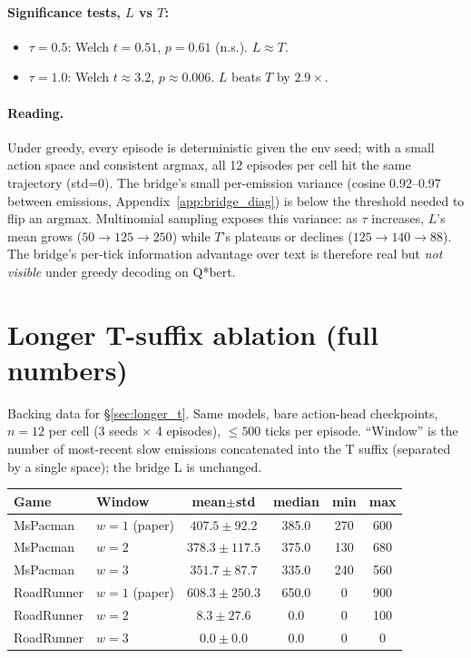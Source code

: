 \documentclass[11pt]{article}
\begin{document}
\paragraph{Significance tests, $L$ vs $T$:}
\begin{itemize}[topsep=0pt,itemsep=0pt,leftmargin=*]
\item $\tau\!=\!0.5$: Welch $t=0.51$, $p=0.61$ (n.s.). $L\!\approx\!T$.
\item $\tau\!=\!1.0$: Welch $t\!\approx\!3.2$, $p\!\approx\!0.006$. $L$ beats $T$ by $2.9\times$.
\end{itemize}

\paragraph{Reading.} Under greedy, every episode is deterministic given the env seed; with a small action space and consistent argmax, all 12 episodes per cell hit the same trajectory (std=0). The bridge's small per-emission variance (cosine 0.92--0.97 between emissions, Appendix~\ref{app:bridge_diag}) is below the threshold needed to flip an argmax. Multinomial sampling exposes this variance: as $\tau$ increases, $L$'s mean grows ($50\!\to\!125\!\to\!250$) while $T$'s plateaus or declines ($125\!\to\!140\!\to\!88$). The bridge's per-tick information advantage over text is therefore real but \emph{not visible} under greedy decoding on Q*bert.

\section{Longer T-suffix ablation (full numbers)}
\label{app:longer_t}

Backing data for \S\ref{sec:longer_t}. Same models, bare action-head checkpoints, $n\!=\!12$ per cell (3 seeds $\times$ 4 episodes), $\le\!500$ ticks per episode. ``Window'' is the number of most-recent slow emissions concatenated into the T suffix (separated by a single space); the bridge L is unchanged.

\smallskip\noindent
\begin{tabular}{llcccc}
\toprule
Game        & Window & mean$\pm$std & median & min & max \\
\midrule
MsPacman    & $w=1$ (paper) & $407.5\pm92.2$  & 385.0 & 270 & 600  \\
MsPacman    & $w=2$         & $378.3\pm117.5$ & 375.0 & 130 & 680  \\
MsPacman    & $w=3$         & $351.7\pm87.7$  & 335.0 & 240 & 560  \\
\midrule
RoadRunner  & $w=1$ (paper) & $608.3\pm250.3$ & 650.0 &   0 & 900  \\
RoadRunner  & $w=2$         & $8.3\pm27.6$    &   0.0 &   0 & 100  \\
RoadRunner  & $w=3$         & $0.0\pm0.0$     &   0.0 &   0 &   0  \\
\bottomrule
\end{tabular}\smallskip
\end{document}
